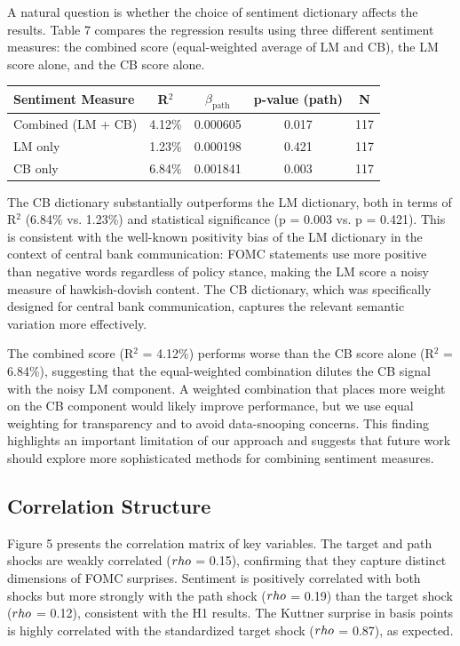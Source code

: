 \documentclass[12pt]{article}
\begin{document}
A natural question is whether the choice of sentiment dictionary affects the results. Table 7 compares the regression results using three different sentiment measures: the combined score (equal-weighted average of LM and CB), the LM score alone, and the CB score alone.

\begin{table}[htbp]\centering
\begin{tabular}{lcccc}\toprule
Sentiment Measure & R$^2$ & $\beta_{\text{path}}$ & p-value (path) & N \\\midrule
Combined (LM + CB) & 4.12\% & 0.000605 & 0.017 & 117 \\
LM only & 1.23\% & 0.000198 & 0.421 & 117 \\
CB only & 6.84\% & 0.001841 & 0.003 & 117 \\
\bottomrule\end{tabular}
\end{table}

The CB dictionary substantially outperforms the LM dictionary, both in terms of R$^2$ (6.84\% vs. 1.23\%) and statistical significance (p = 0.003 vs. p = 0.421). This is consistent with the well-known positivity bias of the LM dictionary in the context of central bank communication: FOMC statements use more positive than negative words regardless of policy stance, making the LM score a noisy measure of hawkish-dovish content. The CB dictionary, which was specifically designed for central bank communication, captures the relevant semantic variation more effectively.

The combined score (R$^2$ = 4.12\%) performs worse than the CB score alone (R$^2$ = 6.84\%), suggesting that the equal-weighted combination dilutes the CB signal with the noisy LM component. A weighted combination that places more weight on the CB component would likely improve performance, but we use equal weighting for transparency and to avoid data-snooping concerns. This finding highlights an important limitation of our approach and suggests that future work should explore more sophisticated methods for combining sentiment measures.

\subsection{Correlation Structure}

Figure 5 presents the correlation matrix of key variables. The target and path shocks are weakly correlated ($\\rho$ = 0.15), confirming that they capture distinct dimensions of FOMC surprises. Sentiment is positively correlated with both shocks but more strongly with the path shock ($\\rho$ = 0.19) than the target shock ($\\rho$ = 0.12), consistent with the H1 results. The Kuttner surprise in basis points is highly correlated with the standardized target shock ($\\rho$ = 0.87), as expected.
\end{document}
